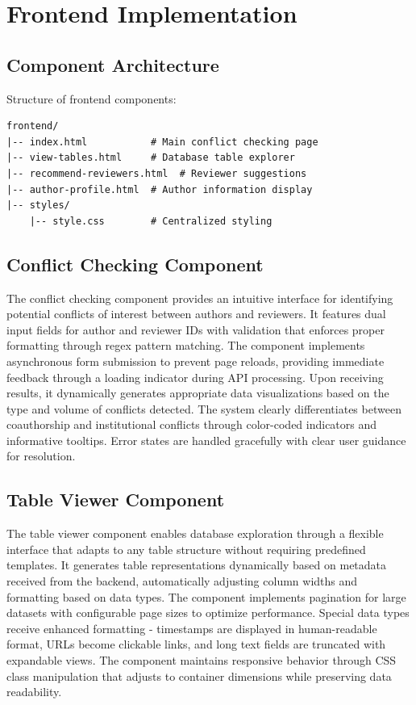 \section{Frontend Implementation}

\subsection{Component Architecture}
Structure of frontend components:
\begin{verbatim}
frontend/
|-- index.html           # Main conflict checking page
|-- view-tables.html     # Database table explorer
|-- recommend-reviewers.html  # Reviewer suggestions
|-- author-profile.html  # Author information display
|-- styles/
    |-- style.css        # Centralized styling
\end{verbatim}

\subsection{Conflict Checking Component}
The conflict checking component provides an intuitive interface for identifying potential conflicts of interest between authors and reviewers. It features dual input fields for author and reviewer IDs with validation that enforces proper formatting through regex pattern matching. The component implements asynchronous form submission to prevent page reloads, providing immediate feedback through a loading indicator during API processing. Upon receiving results, it dynamically generates appropriate data visualizations based on the type and volume of conflicts detected. The system clearly differentiates between coauthorship and institutional conflicts through color-coded indicators and informative tooltips. Error states are handled gracefully with clear user guidance for resolution.

\subsection{Table Viewer Component}
The table viewer component enables database exploration through a flexible interface that adapts to any table structure without requiring predefined templates. It generates table representations dynamically based on metadata received from the backend, automatically adjusting column widths and formatting based on data types. The component implements pagination for large datasets with configurable page sizes to optimize performance. Special data types receive enhanced formatting - timestamps are displayed in human-readable format, URLs become clickable links, and long text fields are truncated with expandable views. The component maintains responsive behavior through CSS class manipulation that adjusts to container dimensions while preserving data readability.

